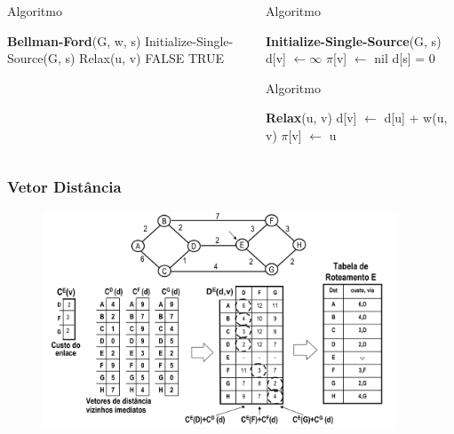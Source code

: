 \documentclass{beamer}
\begin{document}
\begin{frame}
\begin{columns}
	\begin{column}{0.5\textwidth}
	\begin{block}{Algoritmo}
	\begin{algorithmic}
	    \STATE \textbf{Bellman-Ford}(G, w, s)
	    \STATE Initialize-Single-Source(G, s)
	    		\STATE Relax(u, v)
	    	\ENDFOR
	    \ENDFOR 
	    		\RETURN FALSE
	    	\ENDIF
	   	\ENDFOR
	   	\RETURN TRUE
	\end{algorithmic}
	\end{block}
	\end{column}
	
	\begin{column}{0.5\textwidth}
		\begin{block}{Algoritmo}
			\begin{algorithmic}
				\STATE \textbf{Initialize-Single-Source}(G, s)
				\FORALL{v $\in$ V[G]}
					\STATE d[v] $\gets \infty$
					\STATE $\pi$[v] $\gets$ nil
				\ENDFOR
				\STATE d[s] = 0
			\end{algorithmic}
		\end{block}
		
 		\begin{block}{Algoritmo}
 			\begin{algorithmic}
 				\STATE \textbf{Relax}(u, v)
 				\IF{d[v] > d[u] + w(u, v)}
 					\STATE d[v] $\gets$ d[u] + w(u, v)
 					\STATE $\pi$[v] $\gets$ u
				\ENDIF			
 			\end{algorithmic}
 		\end{block}
	\end{column}
\end{columns}

\end{frame}

\begin{frame}
\frametitle{Vetor Distância}
\begin{figure}[htp]
\begin{center}
  \includegraphics[width=105mm]{Imagens/VetorDistancia.png}
  \label{vetor_distancia}
\end{center}
\end{figure}
\end{frame}
\end{document}
